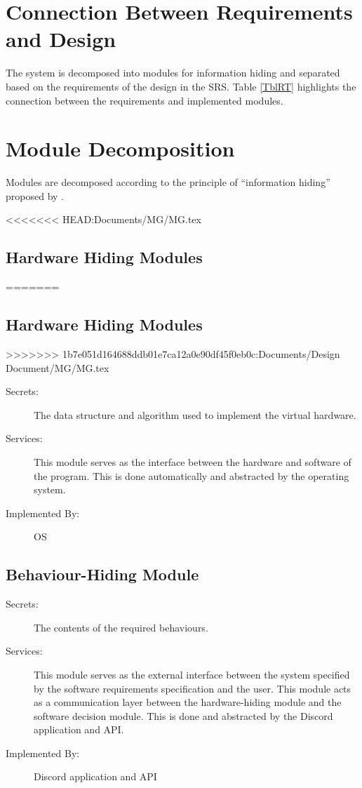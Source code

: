 \documentclass[12pt, titlepage]{article}
\begin{document}
\section{Connection Between Requirements and Design} \label{SecConnection}

The system is decomposed into modules for information hiding and separated based on the requirements of the design in the SRS. Table \ref{TblRT} highlights the connection between the requirements and implemented modules. 

\section{Module Decomposition} \label{SecMD}

Modules are decomposed according to the principle of ``information hiding''
proposed by \citet{ParnasEtAl1984}.

<<<<<<< HEAD:Documents/MG/MG.tex
\subsection{Hardware Hiding Modules}
=======
\subsection{Hardware Hiding Modules }
>>>>>>> 1b7e051d164688ddb01e7ca12a0e90df45f0eb0c:Documents/Design Document/MG/MG.tex

\begin{description}
\item[Secrets:]The data structure and algorithm used to implement the virtual
  hardware.
\item[Services:]This module serves as the interface between the hardware and software of the program. This is done automatically and abstracted by the operating system.
\item[Implemented By:] OS
\end{description}

\subsection{Behaviour-Hiding Module}

\begin{description}
\item[Secrets:]The contents of the required behaviours.
\item[Services:]This module serves as the external interface between the system specified by the software requirements specification and the user. This module acts as a communication layer between the hardware-hiding module and the software decision module. This is done and abstracted by the Discord application and API. 
\item[Implemented By:] Discord application and API
\end{description}
\end{document}
